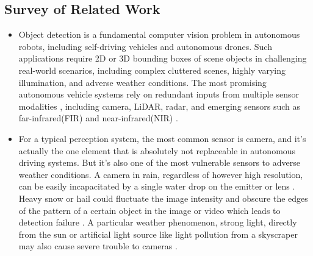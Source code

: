 \documentclass[rnd]{mas_proposal}
\begin{document}
\subsection{Survey of Related Work}
\begin{itemize}
    



    \item Object detection is a fundamental computer vision problem in autonomous robots, including self-driving vehicles and autonomous drones. Such applications require 2D or 3D bounding boxes of scene objects in challenging real-world scenarios, including complex cluttered scenes, highly varying illumination, and adverse weather conditions. The most promising autonomous vehicle systems rely on redundant inputs from multiple sensor modalities \cite{caesar2020nuscenes} \cite{sun2020scalability} \cite{ziegler2014making}, including camera, LiDAR, radar, and emerging sensors such as far-infrared(FIR) and near-infrared(NIR) \cite{bijelic2020seeing}.

    \item For a typical perception system, the most common sensor is camera, and it's actually the one element that is absolutely not replaceable in autonomous driving systems. But it's also one of the most vulnerable sensors to adverse weather conditions. A camera in rain, regardless of however high resolution, can be easily incapacitated by a single water drop on the emitter or lens \cite{mardirosian2021LiDAR}. Heavy snow or hail could fluctuate the image intensity and obscure the edges of the pattern of a certain object in the image or video which leads to detection failure \cite{zang2019impact}. A particular weather phenomenon, strong light, directly from the sun or artificial light source like light pollution from a skyscraper may also cause severe trouble to cameras \cite{acarballo2020libre}.


\end{itemize}
\end{document}
